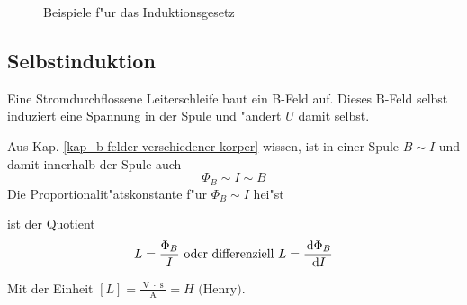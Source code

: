 \begin{Beispiel}
\begin{itemize}
   \end{itemize}
   \begin{figure}[h]
      \centering
      \caption{Beispiele f"ur das Induktionsgesetz}
      \label{abb_induktionsgesetz_bsp}
   \end{figure}
\end{Beispiel}






\subsection{Selbstinduktion}
\label{kap_selbstinduktion}

Eine Stromdurchflossene Leiterschleife baut ein B-Feld auf. Dieses
B-Feld selbst induziert eine Spannung in der Spule und "andert $U$
damit selbst.

Aus Kap. \ref{kap_b-felder-verschiedener-korper} wissen, ist in einer
Spule $B \sim I$ und damit innerhalb der Spule auch
\begin{equation*}
   \Phi_B \sim I \sim B
\end{equation*}
Die Proportionalit"atskonstante f"ur $\Phi_B \sim I$ hei"st
\begin{Def}
    ist der Quotient
  \begin{equation}
     \label{eq:335}
     L = \frac{\Phi_B}{I} \text{ oder differenziell } L = \frac{\, \mathrm{d}
       \Phi_B}{\, \mathrm{d} I}
  \end{equation}
\end{Def}
Mit der Einheit $[L] =
\frac{\operatorname{V}\cdot\operatorname{s}}{\operatorname{A}} = H
\text{ (Henry)}$.

